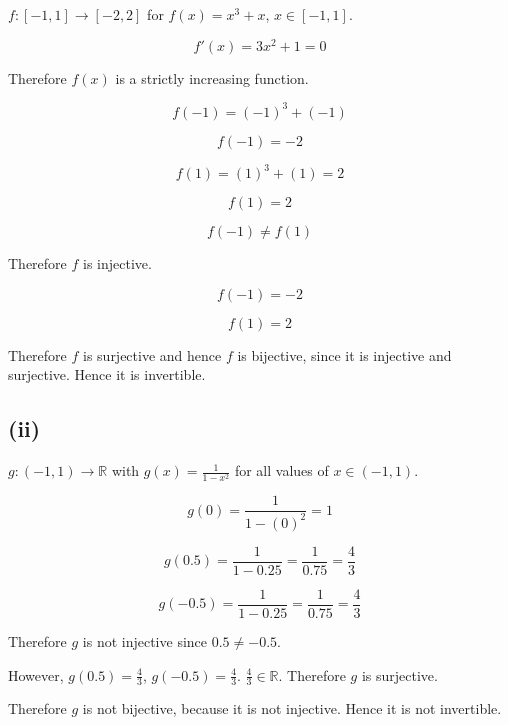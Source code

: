 \documentclass[a4paper,12pt]{article}
\begin{document}
$ f : [-1, 1] \to [-2, 2] $ for $f(x) = x^{3} + x$, $x \in [-1, 1]$.

\[ f'(x) = 3x^{2} + 1 = 0 \]

\noindent Therefore $f(x)$ is a strictly increasing function.

\[ f(-1) = (-1)^{3} + (-1) \]

\[ f(-1) = -2 \]

\[ f(1) = (1)^{3} + (1) = 2 \]

\[ f(1) = 2 \]

\[ f(-1) \neq f(1) \]

\noindent Therefore $f$ is injective.

\[ f(-1) = -2 \]

\[ f(1) = 2 \]

\noindent Therefore $f$ is surjective and hence $f$ is bijective, since it
is injective and surjective. Hence it is invertible.

\subsection*{(ii)}

\noindent $g : (-1, 1) \to \mathbb{R}$ with $g(x) = \frac{1}{1 - x^{2}}$ for all
values of $x \in (-1, 1)$.

\[ g(0) = \frac{1}{1 - (0)^{2}} = 1 \]

\[ g(0.5) = \frac{1}{1 - 0.25} = \frac{1}{0.75} = \frac{4}{3} \]

\[ g(-0.5) = \frac{1}{1 - 0.25} = \frac{1}{0.75} = \frac{4}{3} \]

\noindent Therefore $g$ is not injective since $0.5 \neq -0.5$.

\vspace{10mm}

\noindent However, $g(0.5) = \frac{4}{3}$, $g(-0.5) = \frac{4}{3}$. $\frac{4}{3}
\in \mathbb{R}$. Therefore $g$ is surjective.

\noindent Therefore $g$ is not bijective, because it is not injective.
Hence it is not invertible.
\end{document}
